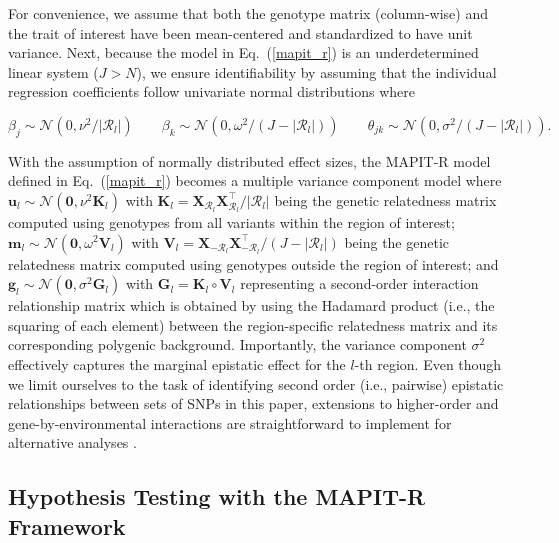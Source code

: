 \documentclass[10pt]{article}
\def\eq#1{(\ref{#1})}
\newcommand{\bg}{\mathbf{g}}
\newcommand{\bu}{\mathbf{u}}
\newcommand{\bfm}{\mathbf{m}}
\newcommand{\bK}{\mathbf{K}}
\newcommand{\bV}{\mathbf{V}}
\newcommand{\bX}{\mathbf{X}}
\newcommand{\bG}{\mathbf{G}}
\newcommand{\T}{\intercal}
\newcommand{\N}{\mathcal{N}}
\begin{document}
For convenience, we assume that both the genotype matrix (column-wise) and the trait of interest have been mean-centered and standardized to have unit variance. Next, because the model in Eq.~\eq{mapit_r} is an underdetermined linear system ($J > N$), we ensure identifiability by assuming that the individual regression coefficients follow univariate normal distributions where 
\begin{linenomath*}
\begin{equation}
\beta_j\sim \N(0,\nu^2/|\mathcal{R}_l|) \quad \quad \beta_k\sim\N(0,\omega^2/(J-|\mathcal{R}_l|)) \quad \quad \theta_{jk}\sim\N(0,\sigma^2/(J-|\mathcal{R}_l|)).\label{coef}
\end{equation}
\end{linenomath*}
With the assumption of normally distributed effect sizes, the MAPIT-R model defined in Eq.~\eq{mapit_r} becomes a multiple variance component model where $\bu_l\sim\N(\bm{0},\nu^2\bK_l)$ with $\bK_l = \bX_{\mathcal{R}_l}\bX_{\mathcal{R}_l}^{\T}/|\mathcal{R}_l|$ being the genetic relatedness matrix computed using genotypes from all variants within the region of interest; $\bfm_l \sim \N(\bm{0}, \omega^2\bV_l)$ with $\bV_l = \bX_{-\mathcal{R}_l}\bX_{-\mathcal{R}_l}^{\T}/(J-|\mathcal{R}_l|)$ being the genetic relatedness matrix computed using genotypes outside the region of interest; and $\bg_l \sim \N(\bm{0},\sigma^2\bG_l)$ with $\bG_l = \bK_l \circ \bV_l$ representing a second-order interaction relationship matrix which is obtained by using the Hadamard product (i.e., the squaring of each element) between the region-specific relatedness matrix and its corresponding polygenic background. Importantly, the variance component $\sigma^2$ effectively captures the marginal epistatic effect for the $l$-th region. Even though we limit ourselves to the task of identifying second order (i.e., pairwise) epistatic relationships between sets of SNPs in this paper, extensions to higher-order and gene-by-environmental interactions are straightforward to implement for alternative analyses \cite{Jiang2015,Crawford2017a,Zhou2017,Crawford2018a,Moore2019}.

\subsection*{Hypothesis Testing with the MAPIT-R Framework}
\end{document}
